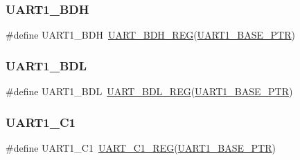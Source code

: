 \subsubsection{\texorpdfstring{U\+A\+R\+T1\+\_\+\+B\+DH}{UART1\_BDH}}
{\footnotesize\ttfamily \#define U\+A\+R\+T1\+\_\+\+B\+DH~\hyperlink{group___u_a_r_t___register___accessor___macros_ga87a103f3d6a0d05f6b0c909cfeb7a4d9}{U\+A\+R\+T\+\_\+\+B\+D\+H\+\_\+\+R\+EG}(\hyperlink{group___u_a_r_t___peripheral_gafb5b1236c1cdf2d9a6464251b791030c}{U\+A\+R\+T1\+\_\+\+B\+A\+S\+E\+\_\+\+P\+TR})}

\mbox{\label{group___u_a_r_t___register___accessor___macros_gae8924d1fd89b33ae7d25b0727dab5c47}} 
\subsubsection{\texorpdfstring{U\+A\+R\+T1\+\_\+\+B\+DL}{UART1\_BDL}}
{\footnotesize\ttfamily \#define U\+A\+R\+T1\+\_\+\+B\+DL~\hyperlink{group___u_a_r_t___register___accessor___macros_ga76a25b51a88219d40b957fed02d5e196}{U\+A\+R\+T\+\_\+\+B\+D\+L\+\_\+\+R\+EG}(\hyperlink{group___u_a_r_t___peripheral_gafb5b1236c1cdf2d9a6464251b791030c}{U\+A\+R\+T1\+\_\+\+B\+A\+S\+E\+\_\+\+P\+TR})}

\mbox{\label{group___u_a_r_t___register___accessor___macros_gaabfc6382968ea7dd6bb14f7098f28fd9}} 
\subsubsection{\texorpdfstring{U\+A\+R\+T1\+\_\+\+C1}{UART1\_C1}}
{\footnotesize\ttfamily \#define U\+A\+R\+T1\+\_\+\+C1~\hyperlink{group___u_a_r_t___register___accessor___macros_ga10f9aabe3d0f670422c5342bebc3f3e2}{U\+A\+R\+T\+\_\+\+C1\+\_\+\+R\+EG}(\hyperlink{group___u_a_r_t___peripheral_gafb5b1236c1cdf2d9a6464251b791030c}{U\+A\+R\+T1\+\_\+\+B\+A\+S\+E\+\_\+\+P\+TR})}

